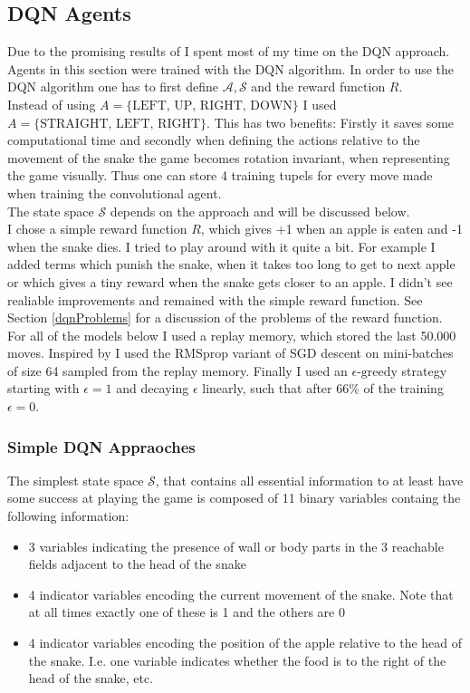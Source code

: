 \documentclass{article}
\begin{document}
\subsection{DQN Agents}
\label{dqnAgents}
Due to the promising results of \cite{atari} I spent most of my time on the DQN approach. Agents in this section were trained with the DQN algorithm.
In order to use the DQN algorithm one has to first define $\mathcal{A}, \mathcal{S}$ and the reward function $R$. \\
Instead of using ${A=\{ \text{LEFT, UP, RIGHT, DOWN}\} }$ I used ${A=\{ \text{STRAIGHT, LEFT, RIGHT}\} }$. This has two benefits: Firstly it saves some computational time and secondly when defining the actions relative to the movement of the snake the game becomes rotation invariant, when representing the game visually. Thus one can store 4 training tupels for every move made when training the convolutional agent. \\
The state space $\mathcal{S}$ depends on the approach and will be discussed below. \\
I chose a simple reward function $R$, which gives +1 when an apple is eaten and -1 when the snake dies. I tried to play around with it quite a bit. For example I added terms which punish the snake, when it takes too long to get to next apple or which gives a tiny reward when the snake gets closer to an apple. I didn't see realiable improvements and remained with the simple reward function. See Section \ref{dqnProblems} for a discussion of the problems of the reward function. \\
For all of the models below I used a replay memory, which stored the last 50.000 moves. Inspired by \cite{atari} I used the RMSprop variant of SGD descent on mini-batches of size 64 sampled from the replay memory. Finally I used an $\epsilon \text{-greedy}$ strategy starting with $\epsilon=1$ and decaying $\epsilon$ linearly, such that after 66\% of the training $\epsilon=0$.

\subsubsection{Simple DQN Appraoches}

The simplest state space $\mathcal{S}$, that contains all essential information to at least have some success at playing the game is composed of 11 binary variables containg the following information:
\begin{itemize}
	\item 3 variables indicating the presence of wall or body parts in the 3 reachable fields adjacent to the head of the snake
	\item 4 indicator variables encoding the current movement of the snake. Note that at all times exactly one of these is 1 and the others are 0
	\item 4 indicator variables encoding the position of the apple relative to the head of the snake. I.e. one variable indicates whether the food is to the right of the head of the snake, etc.

\end{itemize}
\end{document}
